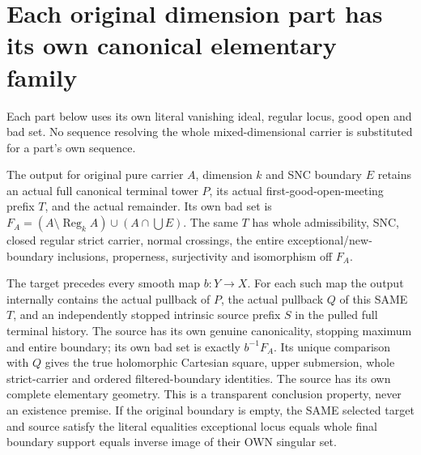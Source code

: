 \section{Each original dimension part has its own canonical elementary family}

Each part below uses its own literal vanishing ideal, regular locus,
good open and bad set. No sequence resolving the whole mixed-dimensional
carrier is substituted for a part's own sequence.

\begin{definition}
\label{hir:original-independent-pure-boundary-output}
\leanok
The output for original pure carrier $A$, dimension $k$ and SNC boundary
$E$ retains an actual full canonical terminal tower $P$, its actual
first-good-open-meeting prefix $T$, and the actual remainder. Its own
bad set is $F_A=(A\setminus\operatorname{Reg}_k A)\cup(A\cap\bigcup E)$.
The same $T$ has whole admissibility, SNC, closed regular strict carrier,
normal crossings, the entire exceptional/new-boundary inclusions,
properness, surjectivity and isomorphism off $F_A$.

The target precedes every smooth map $b:Y\to X$. For each such map the
output internally contains the actual pullback of $P$, the actual
pullback $Q$ of this SAME $T$, and an independently stopped intrinsic
source prefix $S$ in the pulled full terminal history. The source has
its own genuine canonicality, stopping maximum and entire boundary;
its own bad set is exactly $b^{-1}F_A$. Its unique comparison with $Q$
gives the true holomorphic Cartesian square, upper submersion, whole
strict-carrier and ordered filtered-boundary identities. The source
has its own complete elementary geometry. This is a transparent
conclusion property, never an existence premise.
If the original boundary is empty, the SAME selected target and
source satisfy the literal equalities exceptional locus equals whole
final boundary support equals inverse image of their OWN singular set.
\end{definition}

